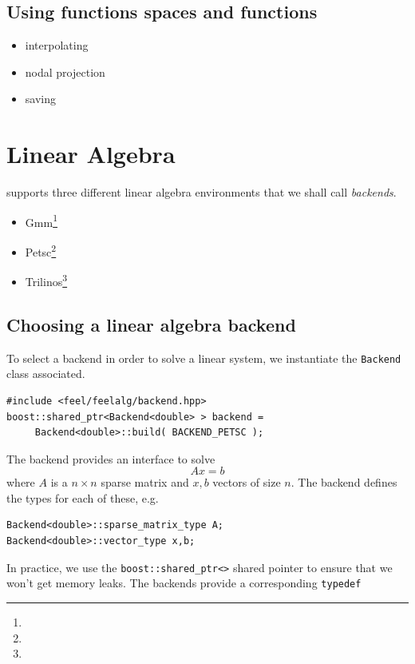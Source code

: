 \subsection{Using functions spaces and functions}

\begin{itemize}
\item interpolating
\item nodal projection
\item saving
\end{itemize}


\section{Linear Algebra}
\label{sec:linear-algebra}


\feel supports three different linear algebra environments that we
shall call \emph{backends}.
\begin{itemize}
\item Gmm\footnote{}
\item Petsc\footnote{}
\item Trilinos\footnote{}
\end{itemize}


\subsection{Choosing a linear algebra backend}
\label{sec:choos-line-algebra}

To select a backend in order to solve a linear system, we instantiate
the \lstinline!Backend! class associated.

\begin{lstlisting}
#include <feel/feelalg/backend.hpp>
boost::shared_ptr<Backend<double> > backend =
     Backend<double>::build( BACKEND_PETSC );
\end{lstlisting}

The backend provides an interface to solve
\begin{equation}
  \label{eq:8}
  A x = b
\end{equation}
\noindent
where $A$ is a $n \times n $ sparse matrix and $x,b$ vectors of size $n$.
The backend defines the \cpp types for  each of these, e.g.
\begin{lstlisting}
Backend<double>::sparse_matrix_type A;
Backend<double>::vector_type x,b;
\end{lstlisting}
\noindent
In practice, we use the \lstinline!boost::shared_ptr<>! shared pointer
to ensure that we won't get memory leaks. The backends provide a
corresponding \lstinline!typedef!


